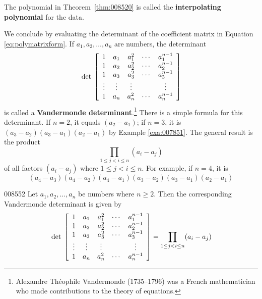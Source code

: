 \noindent The polynomial in Theorem~\ref{thm:008520} is called the \textbf{interpolating polynomial} for the data.


We conclude by evaluating the determinant of the coefficient matrix in Equation \ref{eq:polymatrixform}. If $a_{1}, a_{2}, \dots, a_{n}$ are numbers, the determinant
\begin{equation*}
\thinspace\operatorname{det\medspace} \left[ \begin{array}{ccccc}
1 & a_1 & a_1^2 & \cdots & a_1^{n-1}\\
1 & a_2 & a_2^2 & \cdots & a_2^{n-1}\\
1 & a_3 & a_3^2 & \cdots & a_3^{n-1}\\
\vdots & \vdots & \vdots & & \vdots \\
1 & a_n & a_n^2 & \cdots & a_n^{n-1}\\
\end{array}\right] 
\end{equation*}
is called a \textbf{Vandermonde determinant}.\footnote{Alexandre Th\'{e}ophile Vandermonde (1735--1796) was a French mathematician who made contributions to the theory of equations.}
 There is a simple formula for this determinant. If $n = 2$, it equals $(a_{2} - a_{1})$; if $n = 3$, it is $(a_{3} - a_{2})(a_{3} - a_{1})(a_{2} - a_{1})$ by Example \ref{exa:007851}. The general result is the product
\begin{equation*}
\prod_{ 1 \le j < i \le n} (a_i - a_j)
\end{equation*}
of all factors $(a_{i} - a_{j})$ where $1 \leq j < i \leq n$. For example, if $n = 4$, it is
\begin{equation*}
(a_4-a_3)(a_4-a_2)(a_4-a_1)(a_3-a_2)(a_3-a_1)(a_2-a_1)
\end{equation*}
\begin{theorem}{}{008552}
Let $a_{1}, a_{2}, \dots , a_{n}$ be numbers where $n \geq 2$. Then the corresponding Vandermonde determinant is given by
\begin{equation*}
\thinspace\operatorname{det\medspace} \left[ \begin{array}{ccccc}
1 & a_1 & a_1^2 & \cdots & a_1^{n-1}\\
1 & a_2 & a_2^2 & \cdots & a_2^{n-1}\\
1 & a_3 & a_3^2 & \cdots & a_3^{n-1}\\
\vdots & \vdots & \vdots & & \vdots \\
1 & a_n & a_n^2 & \cdots & a_n^{n-1}\\
\end{array}\right] = \prod_{1 \le j < i \le n}(a_i - a_j)
\end{equation*}
\end{theorem}

